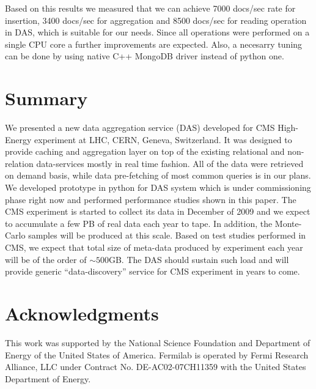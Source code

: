 \documentclass[a4paper]{jpconf}
\begin{document}
Based on this results we measured that we can achieve 7000 docs/sec rate
for insertion, 3400 docs/sec for aggregation and 8500 docs/sec for reading operation
in DAS, which is suitable for our needs. Since all operations were performed 
on a single CPU core a further improvements are expected. Also, a necesarry
tuning can be done by using native C++ MongoDB driver instead of python one.

\section{Summary}
We presented a new data aggregation service (DAS) developed for CMS High-Energy experiment
at LHC, CERN, Geneva, Switzerland. It was designed to provide caching and
aggregation layer on top of the existing relational and non-relation data-services
mostly in real time fashion. All of the data were retrieved on demand basis,
while data pre-fetching of most common queries is in our plans. We developed
prototype in python for DAS system which is under commissioning phase right now 
and performed performance studies shown in this paper. 
The CMS experiment is started to collect its data in December of 2009 and 
we expect to accumulate a few PB of real data each year to tape. 
In addition, the Monte-Carlo samples will be produced at this scale.
Based on test studies performed in CMS, we expect that total size of
meta-data produced by experiment each year will be of the order of
$\sim500$GB. The DAS should sustain such load and will provide generic 
``data-discovery'' service for CMS experiment in years to come.

\section{Acknowledgments}

This work was supported by the National Science Foundation and 
Department of Energy of the United States of America. 
Fermilab is operated by Fermi Research Alliance, LLC under Contract
No. DE-AC02-07CH11359 with the United States Department of Energy.
\end{document}
